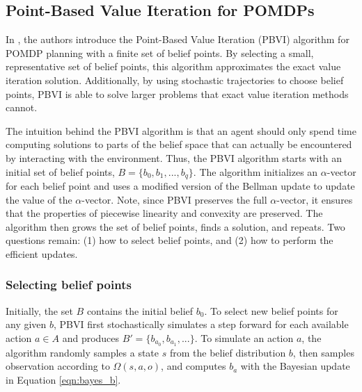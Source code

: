 \documentclass[12pt]{elsarticle}
\begin{document}


\subsection{Point-Based Value Iteration for POMDPs}
\label{PBVI}
In \cite{pineau2003point}, the authors introduce the Point-Based Value Iteration (PBVI) algorithm for POMDP planning with a finite set of belief points. By selecting a small, representative set of belief points, this algorithm approximates the exact value iteration solution. Additionally, by using stochastic trajectories to choose belief points, PBVI is able to solve larger problems that exact value iteration methods cannot.  

The intuition behind the PBVI algorithm is that an agent should only spend time computing solutions to parts of the belief space that can actually be encountered by interacting with the environment. Thus, the PBVI algorithm starts with an initial set of belief points, $B = \{b_0, b_1, ..., b_q\}$. The algorithm initializes an $\alpha$-vector for each belief point and uses a modified version of the Bellman update to update the value of the $\alpha$-vector. Note, since PBVI preserves the full $\alpha$-vector, it ensures that the properties of piecewise linearity and convexity are preserved. The algorithm then grows the set of belief points, finds a solution, and repeats. Two questions remain: (1) how to select belief points, and (2) how to perform the efficient updates.

\subsubsection{Selecting belief points}
Initially, the set $B$ contains the initial belief $b_0$. To select new belief points for any given $b$, PBVI first stochastically simulates a step forward for each available action $a \in A$ and produces $B' = \{ b_{a_0},b_{a_1},...\}$. To simulate an action $a$, the algorithm randomly samples a state $s$ from the belief distribution $b$, then samples observation according to $\Omega(s,a,o)$, and computes $b_{a}$ with the Bayesian update in Equation \ref{eqn:bayes_b}.
\end{document}
